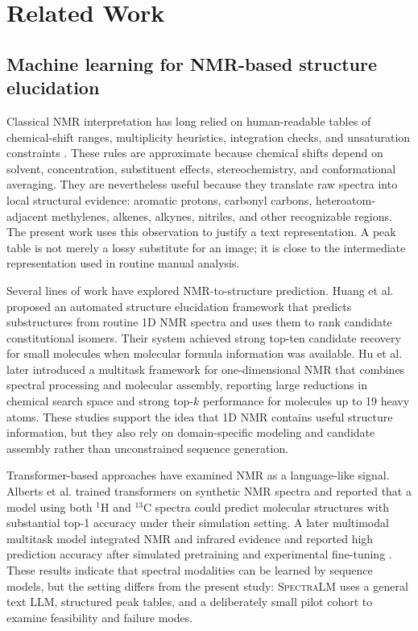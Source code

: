 \documentclass{article}
\newcommand{\spectralm}{\textsc{SpectraLM}}
\begin{document}
\section{Related Work}

\subsection{Machine learning for NMR-based structure elucidation}

Classical NMR interpretation has long relied on human-readable tables of chemical-shift ranges, multiplicity heuristics, integration checks, and unsaturation constraints \cite{Breitmaier2002,Pretsch2009,Claridge2016}. These rules are approximate because chemical shifts depend on solvent, concentration, substituent effects, stereochemistry, and conformational averaging. They are nevertheless useful because they translate raw spectra into local structural evidence: aromatic protons, carbonyl carbons, heteroatom-adjacent methylenes, alkenes, alkynes, nitriles, and other recognizable regions. The present work uses this observation to justify a text representation. A peak table is not merely a lossy substitute for an image; it is close to the intermediate representation used in routine manual analysis.

Several lines of work have explored NMR-to-structure prediction. Huang et al. \cite{Huang2021} proposed an automated structure elucidation framework that predicts substructures from routine 1D NMR spectra and uses them to rank candidate constitutional isomers. Their system achieved strong top-ten candidate recovery for small molecules when molecular formula information was available. Hu et al. \cite{Hu2024} later introduced a multitask framework for one-dimensional NMR that combines spectral processing and molecular assembly, reporting large reductions in chemical search space and strong top-\(k\) performance for molecules up to 19 heavy atoms. These studies support the idea that 1D NMR contains useful structure information, but they also rely on domain-specific modeling and candidate assembly rather than unconstrained sequence generation.

Transformer-based approaches have examined NMR as a language-like signal. Alberts et al. \cite{Alberts2023} trained transformers on synthetic NMR spectra and reported that a model using both \(^{1}\)H and \(^{13}\)C spectra could predict molecular structures with substantial top-1 accuracy under their simulation setting. A later multimodal multitask model integrated NMR and infrared evidence and reported high prediction accuracy after simulated pretraining and experimental fine-tuning \cite{Alberts2025}. These results indicate that spectral modalities can be learned by sequence models, but the setting differs from the present study: \spectralm{} uses a general text LLM, structured peak tables, and a deliberately small pilot cohort to examine feasibility and failure modes.
\end{document}
